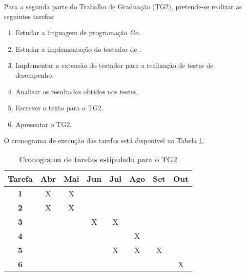 Para a segunda parte do Trabalho de Graduação (TG2), pretende-se realizar as seguintes tarefas:

\begin{enumerate}
    \item{Estudar a linguagem de programação \textit{Go}.}
    \item{Estudar a implementação do testador de \cite{Dominato2021}.}
    \item{Implementar a extensão do testador para a realização de testes de desempenho.}
    \item{Analisar os resultados obtidos nos testes.}
    \item{Escrever o texto para o TG2.}
    \item{Apresentar o TG2.}
\end{enumerate}

O cronograma de execução das tarefas está disponível na Tabela \ref{tab:cronograma-tg2}.

\begin{table}[!ht]
\centering
\caption{Cronograma de tarefas estipulado para o TG2}
\label{tab:cronograma-tg2}
\begin{tabular}{cccccccc}
\hline
\textbf{Tarefa} & \textbf{Abr} & \textbf{Mai} & \textbf{Jun} & \textbf{Jul} & \textbf{Ago} & \textbf{Set} & \textbf{Out} \\ \hline
\textbf{1} & X & X &  &  &  &  &  \\ \hline
\textbf{2} & X & X &  &  &  &  &  \\ \hline
\textbf{3} &  &  & X & X &  &  &  \\ \hline
\textbf{4} &  &  &  &  & X &  &  \\ \hline
\textbf{5} &  &  &  & X & X & X &  \\ \hline
\textbf{6} &  &  &  &  &  &  & X \\ \hline
\end{tabular}
\end{table}